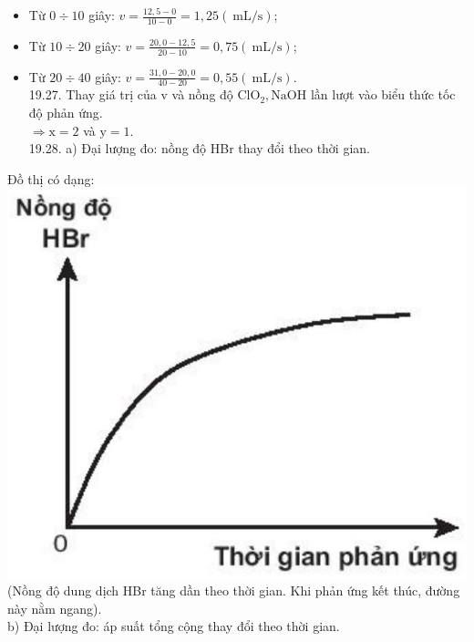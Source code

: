 \documentclass[10pt]{article}
\begin{document}
\begin{itemize}
  \item Từ $0 \div 10$ giây: $v=\frac{12,5-0}{10-0}=1,25(\mathrm{~mL} / \mathrm{s})$;
  \item Từ $10 \div 20$ giây: $v=\frac{20,0-12,5}{20-10}=0,75(\mathrm{~mL} / \mathrm{s})$;
  \item Từ $20 \div 40$ giây: $v=\frac{31,0-20,0}{40-20}=0,55(\mathrm{~mL} / \mathrm{s})$.\\
19.27. Thay giá trị của v và nồng độ $\mathrm{ClO}_{2}, \mathrm{NaOH}$ lần lượt vào biểu thức tốc độ phản ứng.\\
$\Rightarrow \mathrm{x}=2$ và $\mathrm{y}=1$.\\
19.28. a) Đại lượng đo: nồng độ HBr thay đổi theo thời gian.
\end{itemize}

Đồ thị có dạng:\\
\includegraphics[max width=\textwidth, center]{2025_10_23_ee735750217b2aca435cg-46(1)}\\
(Nồng độ dung dịch HBr tăng dần theo thời gian. Khi phản ứng kết thúc, đường này nằm ngang).\\
b) Đại lượng đo: áp suất tổng cộng thay đổi theo thời gian.
\end{document}
